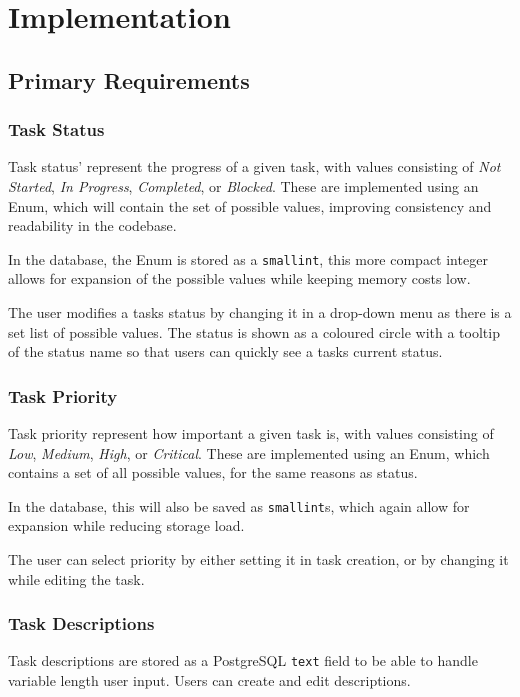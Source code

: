 
\newpage
\section{Implementation}

\subsection{Primary Requirements}
\subsubsection{Task Status}
Task status' represent the progress of a given task, with values consisting of \textit{Not Started}, \textit{In Progress}, \textit{Completed}, or \textit{Blocked}.
These are implemented using an Enum, which will contain the set of possible values, improving consistency and readability in the codebase.

In the database, the Enum is stored as a \verb|smallint|, this more compact integer allows for expansion of the possible values while keeping memory costs low. 

The user modifies a tasks status by changing it in a drop-down menu as there is a set list of possible values.
The status is shown as a coloured circle with a tooltip of the status name so that users can quickly see a tasks current status.


\subsubsection{Task Priority}
Task priority represent how important a given task is, with values consisting of \textit{Low}, \textit{Medium}, \textit{High}, or \textit{Critical}.
These are implemented using an Enum, which contains a set of all possible values, for the same reasons as status.

In the database, this will also be saved as \verb|smallint|s, which again allow for expansion while reducing storage load.

The user can select priority by either setting it in task creation, or by changing it while editing the task.



\subsubsection{Task Descriptions}
Task descriptions are stored as a PostgreSQL \verb|text| field to be able to handle variable length user input. Users can create and edit descriptions.


